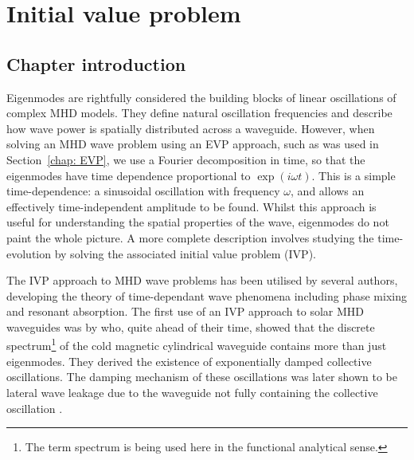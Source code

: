 
\chapter{Initial value problem}
\label{chap: IVP}

\section{Chapter introduction}
\label{sec: IVP intro}

Eigenmodes are rightfully considered the building blocks of linear oscillations of complex MHD models. They define natural oscillation frequencies and describe how wave power is spatially distributed across a waveguide. However, when solving an MHD wave problem using an EVP approach, such as was used in Section~\ref{chap: EVP}, we use a Fourier decomposition in time, so that the eigenmodes have time dependence proportional to $\exp(i\omega t)$. This is a simple time-dependence: a sinusoidal oscillation with frequency $\omega$, and allows an effectively time-independent amplitude to be found. Whilst this approach is useful for understanding the spatial properties of the wave, eigenmodes do not paint the whole picture. A more complete description involves studying the time-evolution by solving the associated initial value problem (IVP).

The IVP approach to MHD wave problems has been utilised by several authors, developing the theory of time-dependant wave phenomena including phase mixing and resonant absorption. The first use of an IVP approach to solar MHD waveguides was by \cite{sed71} who, quite ahead of their time, showed that the discrete spectrum\footnote{The term spectrum is being used here in the functional analytical sense.} of the cold magnetic cylindrical waveguide contains more than just eigenmodes. They derived the existence of exponentially damped collective oscillations. The damping mechanism of these oscillations was later shown to be lateral wave leakage due to the waveguide not fully containing the collective oscillation \citep{rud_etal06b}.

